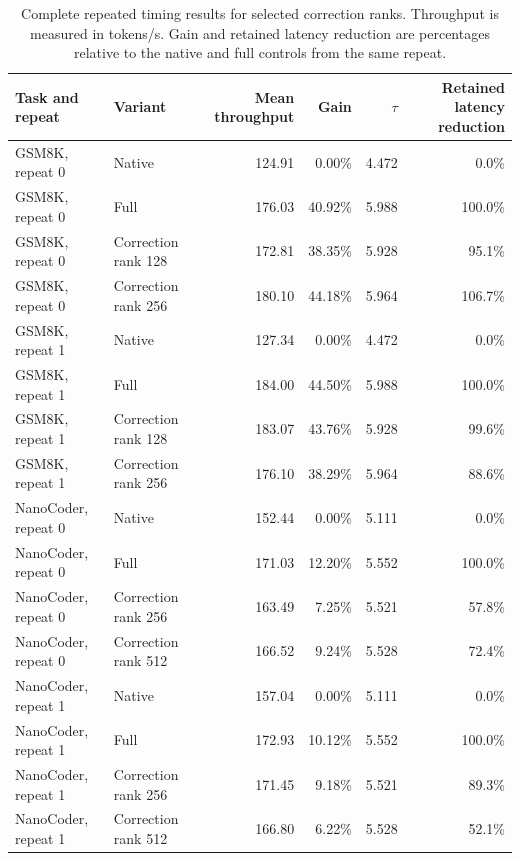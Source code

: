 \begin{table}[htbp]
\centering
\caption{Complete repeated timing results for selected correction ranks. Throughput is measured in tokens/s. Gain and retained latency reduction are percentages relative to the native and full controls from the same repeat.}
\label{tab:app-rank-repeats}
\scriptsize
\begin{tabular}{llrrrr}
\toprule
Task and repeat & Variant & Mean throughput & Gain & $\tau$ & Retained latency reduction \\
\midrule
GSM8K, repeat 0 & Native & 124.91 & 0.00\% & 4.472 & 0.0\% \\
GSM8K, repeat 0 & Full & 176.03 & 40.92\% & 5.988 & 100.0\% \\
GSM8K, repeat 0 & Correction rank 128 & 172.81 & 38.35\% & 5.928 & 95.1\% \\
GSM8K, repeat 0 & Correction rank 256 & 180.10 & 44.18\% & 5.964 & 106.7\% \\
GSM8K, repeat 1 & Native & 127.34 & 0.00\% & 4.472 & 0.0\% \\
GSM8K, repeat 1 & Full & 184.00 & 44.50\% & 5.988 & 100.0\% \\
GSM8K, repeat 1 & Correction rank 128 & 183.07 & 43.76\% & 5.928 & 99.6\% \\
GSM8K, repeat 1 & Correction rank 256 & 176.10 & 38.29\% & 5.964 & 88.6\% \\
NanoCoder, repeat 0 & Native & 152.44 & 0.00\% & 5.111 & 0.0\% \\
NanoCoder, repeat 0 & Full & 171.03 & 12.20\% & 5.552 & 100.0\% \\
NanoCoder, repeat 0 & Correction rank 256 & 163.49 & 7.25\% & 5.521 & 57.8\% \\
NanoCoder, repeat 0 & Correction rank 512 & 166.52 & 9.24\% & 5.528 & 72.4\% \\
NanoCoder, repeat 1 & Native & 157.04 & 0.00\% & 5.111 & 0.0\% \\
NanoCoder, repeat 1 & Full & 172.93 & 10.12\% & 5.552 & 100.0\% \\
NanoCoder, repeat 1 & Correction rank 256 & 171.45 & 9.18\% & 5.521 & 89.3\% \\
NanoCoder, repeat 1 & Correction rank 512 & 166.80 & 6.22\% & 5.528 & 52.1\% \\
\bottomrule
\end{tabular}
\end{table}

